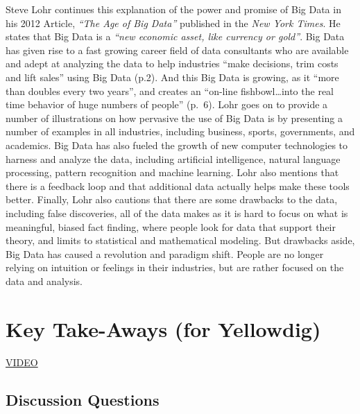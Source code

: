 \documentclass[]{book}
\theoremstyle{definition}
\theoremstyle{definition}
\theoremstyle{definition}
\theoremstyle{remark}
\begin{document}
Steve Lohr continues this explanation of the power and promise of Big
Data in his 2012 Article, \emph{``The Age of Big Data''} published in
the \emph{New York Times}. He states that Big Data is a \emph{``new
economic asset, like currency or gold''}. Big Data has given rise to a
fast growing career field of data consultants who are available and
adept at analyzing the data to help industries ``make decisions, trim
costs and lift sales'' using Big Data (p.2). And this Big Data is
growing, as it ``more than doubles every two years'', and creates an
``on-line fishbowl\ldots{}into the real time behavior of huge numbers of
people'' (p.~6). Lohr goes on to provide a number of illustrations on
how pervasive the use of Big Data is by presenting a number of examples
in all industries, including business, sports, governments, and
academics. Big Data has also fueled the growth of new computer
technologies to harness and analyze the data, including artificial
intelligence, natural language processing, pattern recognition and
machine learning. Lohr also mentions that there is a feedback loop and
that additional data actually helps make these tools better. Finally,
Lohr also cautions that there are some drawbacks to the data, including
false discoveries, all of the data makes as it is hard to focus on what
is meaningful, biased fact finding, where people look for data that
support their theory, and limits to statistical and mathematical
modeling. But drawbacks aside, Big Data has caused a revolution and
paradigm shift. People are no longer relying on intuition or feelings in
their industries, but are rather focused on the data and analysis.

\hypertarget{key-take-aways-for-yellowdig}{%
\section{Key Take-Aways (for
Yellowdig)}\label{key-take-aways-for-yellowdig}}

\href{https://voicethread.com/myvoice/thread/11963613/71077645/66681745}{VIDEO}

\hypertarget{discussion-questions}{%
\subsection{Discussion Questions}\label{discussion-questions}}
\end{document}

